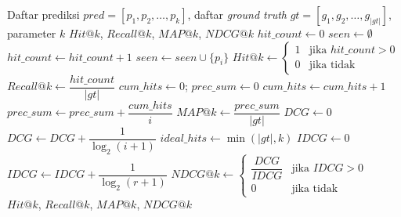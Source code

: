 \begin{algorithm}[H]
\caption{Perhitungan Metrik Evaluasi (Hit, Recall, MAP, NDCG)}
\label{alg:compute_metrics}
\begin{algorithmic}[1]
\Require Daftar prediksi $\mathit{pred} = [p_1, p_2, \ldots, p_k]$, daftar \textit{ground truth} $\mathit{gt} = [g_1, g_2, \ldots, g_{|\mathit{gt}|}]$, parameter $k$
\Ensure $\mathit{Hit}@k$, $\mathit{Recall}@k$, $\mathit{MAP}@k$, $\mathit{NDCG}@k$
\State $\mathit{hit\_count} \gets 0$ 
\State $\mathit{seen} \gets \emptyset$
        \State $\mathit{hit\_count} \gets \mathit{hit\_count} + 1$
        \State $\mathit{seen} \gets \mathit{seen} \cup \{p_i\}$
    \EndIf
\EndFor
\State $\mathit{Hit}@k \gets \begin{cases} 1 & \text{jika } \mathit{hit\_count} > 0 \\ 0 & \text{jika tidak} \end{cases}$
\State $\mathit{Recall}@k \gets \dfrac{\mathit{hit\_count}}{|\mathit{gt}|}$
\State {}
\State $\mathit{cum\_hits} \gets 0$; $\mathit{prec\_sum} \gets 0$
        \State $\mathit{cum\_hits} \gets \mathit{cum\_hits} + 1$
        \State $\mathit{prec\_sum} \gets \mathit{prec\_sum} + \dfrac{\mathit{cum\_hits}}{i}$ 
    \EndIf
\EndFor
\State $\mathit{MAP}@k \gets \dfrac{\mathit{prec\_sum}}{|\mathit{gt}|}$
\State {}
\State $\mathit{DCG} \gets 0$
        \State $\mathit{DCG} \gets \mathit{DCG} + \dfrac{1}{\log_2(i + 1)}$ 
    \EndIf
\EndFor
\State $\mathit{ideal\_hits} \gets \min(|\mathit{gt}|, k)$
\State $\mathit{IDCG} \gets 0$
    \State $\mathit{IDCG} \gets \mathit{IDCG} + \dfrac{1}{\log_2(r + 1)}$
\EndFor
\State $\mathit{NDCG}@k \gets \begin{cases} \dfrac{\mathit{DCG}}{\mathit{IDCG}} & \text{jika } \mathit{IDCG} > 0 \\ 0 & \text{jika tidak} \end{cases}$
\State \Return $\mathit{Hit}@k$, $\mathit{Recall}@k$, $\mathit{MAP}@k$, $\mathit{NDCG}@k$
\end{algorithmic}
\end{algorithm}
